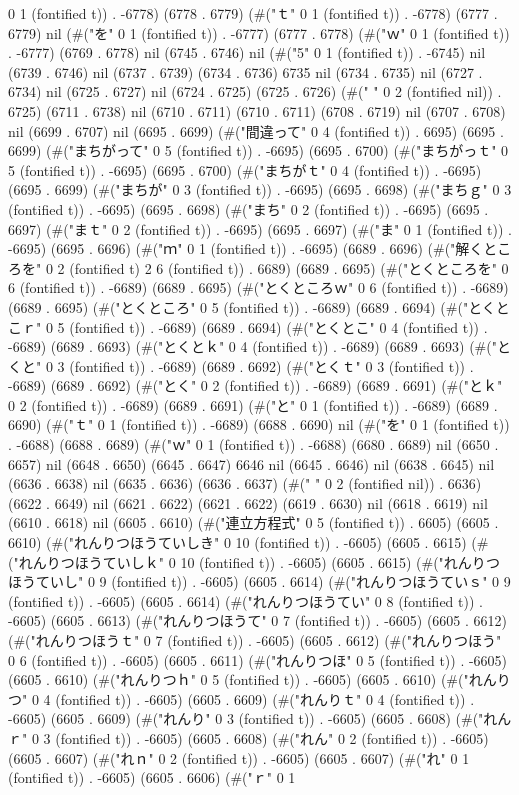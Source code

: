 0 1 (fontified t)) . -6778) (6778 . 6779) (#("ｔ" 0 1 (fontified t)) . -6778) (6777 . 6779) nil (#("を" 0 1 (fontified t)) . -6777) (6777 . 6778) (#("ｗ" 0 1 (fontified t)) . -6777) (6769 . 6778) nil (6745 . 6746) nil (#("5" 0 1 (fontified t)) . -6745) nil (6739 . 6746) nil (6737 . 6739) (6734 . 6736) 6735 nil (6734 . 6735) nil (6727 . 6734) nil (6725 . 6727) nil (6724 . 6725) (6725 . 6726) (#("	 " 0 2 (fontified nil)) . 6725) (6711 . 6738) nil (6710 . 6711) (6710 . 6711) (6708 . 6719) nil (6707 . 6708) nil (6699 . 6707) nil (6695 . 6699) (#("間違って" 0 4 (fontified t)) . 6695) (6695 . 6699) (#("まちがって" 0 5 (fontified t)) . -6695) (6695 . 6700) (#("まちがっｔ" 0 5 (fontified t)) . -6695) (6695 . 6700) (#("まちがｔ" 0 4 (fontified t)) . -6695) (6695 . 6699) (#("まちが" 0 3 (fontified t)) . -6695) (6695 . 6698) (#("まちｇ" 0 3 (fontified t)) . -6695) (6695 . 6698) (#("まち" 0 2 (fontified t)) . -6695) (6695 . 6697) (#("まｔ" 0 2 (fontified t)) . -6695) (6695 . 6697) (#("ま" 0 1 (fontified t)) . -6695) (6695 . 6696) (#("ｍ" 0 1 (fontified t)) . -6695) (6689 . 6696) (#("解くところを" 0 2 (fontified t) 2 6 (fontified t)) . 6689) (6689 . 6695) (#("とくところを" 0 6 (fontified t)) . -6689) (6689 . 6695) (#("とくところｗ" 0 6 (fontified t)) . -6689) (6689 . 6695) (#("とくところ" 0 5 (fontified t)) . -6689) (6689 . 6694) (#("とくとこｒ" 0 5 (fontified t)) . -6689) (6689 . 6694) (#("とくとこ" 0 4 (fontified t)) . -6689) (6689 . 6693) (#("とくとｋ" 0 4 (fontified t)) . -6689) (6689 . 6693) (#("とくと" 0 3 (fontified t)) . -6689) (6689 . 6692) (#("とくｔ" 0 3 (fontified t)) . -6689) (6689 . 6692) (#("とく" 0 2 (fontified t)) . -6689) (6689 . 6691) (#("とｋ" 0 2 (fontified t)) . -6689) (6689 . 6691) (#("と" 0 1 (fontified t)) . -6689) (6689 . 6690) (#("ｔ" 0 1 (fontified t)) . -6689) (6688 . 6690) nil (#("を" 0 1 (fontified t)) . -6688) (6688 . 6689) (#("ｗ" 0 1 (fontified t)) . -6688) (6680 . 6689) nil (6650 . 6657) nil (6648 . 6650) (6645 . 6647) 6646 nil (6645 . 6646) nil (6638 . 6645) nil (6636 . 6638) nil (6635 . 6636) (6636 . 6637) (#("	 " 0 2 (fontified nil)) . 6636) (6622 . 6649) nil (6621 . 6622) (6621 . 6622) (6619 . 6630) nil (6618 . 6619) nil (6610 . 6618) nil (6605 . 6610) (#("連立方程式" 0 5 (fontified t)) . 6605) (6605 . 6610) (#("れんりつほうていしき" 0 10 (fontified t)) . -6605) (6605 . 6615) (#("れんりつほうていしｋ" 0 10 (fontified t)) . -6605) (6605 . 6615) (#("れんりつほうていし" 0 9 (fontified t)) . -6605) (6605 . 6614) (#("れんりつほうていｓ" 0 9 (fontified t)) . -6605) (6605 . 6614) (#("れんりつほうてい" 0 8 (fontified t)) . -6605) (6605 . 6613) (#("れんりつほうて" 0 7 (fontified t)) . -6605) (6605 . 6612) (#("れんりつほうｔ" 0 7 (fontified t)) . -6605) (6605 . 6612) (#("れんりつほう" 0 6 (fontified t)) . -6605) (6605 . 6611) (#("れんりつほ" 0 5 (fontified t)) . -6605) (6605 . 6610) (#("れんりつｈ" 0 5 (fontified t)) . -6605) (6605 . 6610) (#("れんりつ" 0 4 (fontified t)) . -6605) (6605 . 6609) (#("れんりｔ" 0 4 (fontified t)) . -6605) (6605 . 6609) (#("れんり" 0 3 (fontified t)) . -6605) (6605 . 6608) (#("れんｒ" 0 3 (fontified t)) . -6605) (6605 . 6608) (#("れん" 0 2 (fontified t)) . -6605) (6605 . 6607) (#("れｎ" 0 2 (fontified t)) . -6605) (6605 . 6607) (#("れ" 0 1 (fontified t)) . -6605) (6605 . 6606) (#("ｒ" 0 1 